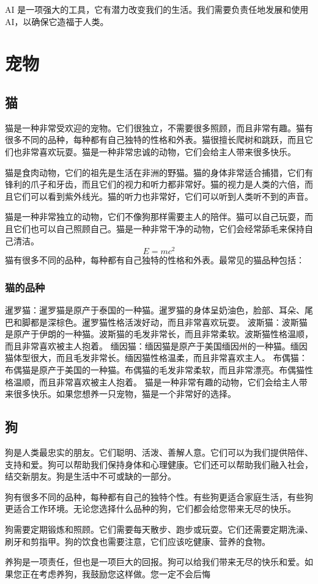 \documentclass[engineeringmaster]{hquThesis}
\begin{document}
AI 是一项强大的工具，它有潜力改变我们的生活。我们需要负责任地发展和使用 AI，以确保它造福于人类。

\chapter{宠物}
\section{猫}
猫是一种非常受欢迎的宠物。它们很独立，不需要很多照顾，而且非常有趣。猫有很多不同的品种，每种都有自己独特的性格和外表。猫很擅长爬树和跳跃，而且它们也非常喜欢玩耍。猫是一种非常忠诚的动物，它们会给主人带来很多快乐。

猫是食肉动物，它们的祖先是生活在非洲的野猫。猫的身体非常适合捕猎，它们有锋利的爪子和牙齿，而且它们的视力和听力都非常好。猫的视力是人类的六倍，而且它们可以看到紫外线光。猫的听力也非常好，它们可以听到人类听不到的声音。

猫是一种非常独立的动物，它们不像狗那样需要主人的陪伴。猫可以自己玩耍，而且它们也可以自己照顾自己。猫是一种非常干净的动物，它们会经常舔毛来保持自己清洁。
\begin{equation}
E = mc^2
\end{equation}
猫有很多不同的品种，每种都有自己独特的性格和外表。最常见的猫品种包括：
\subsection{猫的品种}
暹罗猫：暹罗猫是原产于泰国的一种猫。暹罗猫的身体呈奶油色，脸部、耳朵、尾巴和脚都是深棕色。暹罗猫性格活泼好动，而且非常喜欢玩耍。
波斯猫：波斯猫是原产于伊朗的一种猫。波斯猫的毛发非常长，而且非常柔软。波斯猫性格温顺，而且非常喜欢被主人抱着。
缅因猫：缅因猫是原产于美国缅因州的一种猫。缅因猫体型很大，而且毛发非常长。缅因猫性格温柔，而且非常喜欢主人。
布偶猫：布偶猫是原产于美国的一种猫。布偶猫的毛发非常柔软，而且非常漂亮。布偶猫性格温顺，而且非常喜欢被主人抱着。
猫是一种非常有趣的动物，它们会给主人带来很多快乐。如果您想养一只宠物，猫是一个非常好的选择。

\section{狗}
狗是人类最忠实的朋友。它们聪明、活泼、善解人意。它们可以为我们提供陪伴、支持和爱。狗可以帮助我们保持身体和心理健康。它们还可以帮助我们融入社会，结交新朋友。狗是生活中不可或缺的一部分。

狗有很多不同的品种，每种都有自己的独特个性。有些狗更适合家庭生活，有些狗更适合工作环境。无论您选择什么品种的狗，它们都会给您带来无尽的快乐。

狗需要定期锻炼和照顾。它们需要每天散步、跑步或玩耍。它们还需要定期洗澡、刷牙和剪指甲。狗的饮食也需要注意，它们应该吃健康、营养的食物。

养狗是一项责任，但也是一项巨大的回报。狗可以给我们带来无尽的快乐和爱。如果您正在考虑养狗，我鼓励您这样做。您一定不会后悔
\end{document}
